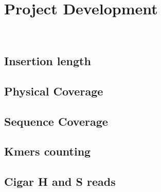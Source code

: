 
\chapter{Project Development}
\label{cap:project-development}

\\

\section{Insertion length}

\section{Physical Coverage}

\section{Sequence Coverage}

\section{Kmers counting}

\section{Cigar H and S reads}